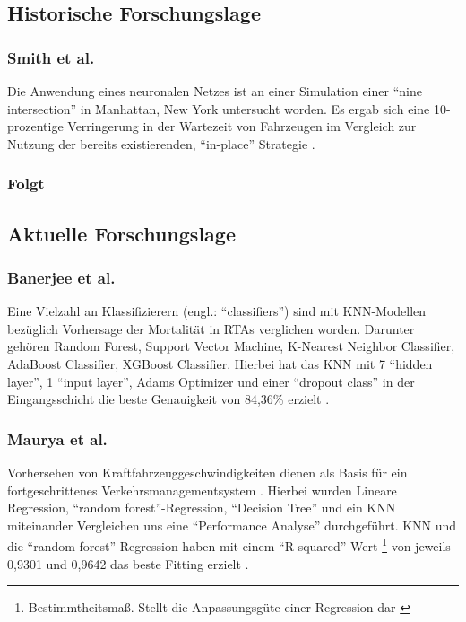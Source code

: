 \documentclass{scrartcl}
\begin{document}
\subsection{Historische Forschungslage}

\subsubsection{Smith et al.}
Die Anwendung eines neuronalen Netzes ist an einer Simulation einer
\enquote{nine intersection} in Manhattan, New York untersucht worden.
Es ergab sich eine 10-prozentige Verringerung in der Wartezeit von Fahrzeugen
im Vergleich zur Nutzung der bereits existierenden, \enquote{in-place} Strategie \cite{smith}.

\subsubsection{Folgt}

\subsection{Aktuelle Forschungslage}

\subsubsection{Banerjee et al.}
Eine Vielzahl an Klassifizierern (engl.: \enquote{classifiers}) sind mit
KNN-Modellen bezüglich Vorhersage der Mortalität in RTAs verglichen worden.
Darunter gehören
Random Forest, Support Vector Machine, K-Nearest Neighbor Classifier,
AdaBoost Classifier, XGBoost Classifier. Hierbei hat das KNN mit 7
\enquote{hidden layer}, 1 \enquote{input layer}, Adams Optimizer und einer
\enquote{dropout class} in der Eingangsschicht die beste Genauigkeit von 84,36\%
erzielt \cite{akt1}.

\subsubsection{Maurya et al.}
Vorhersehen von Kraftfahrzeuggeschwindigkeiten dienen als Basis für ein
fortgeschrittenes Verkehrsmanagementsystem \cite{akt2}. Hierbei wurden
Lineare Regression, \enquote{random forest}-Regression, \enquote{Decision Tree} und
ein KNN miteinander Vergleichen uns eine \enquote{Performance Analyse} durchgeführt.
KNN und die \enquote{random forest}-Regression haben mit einem
\enquote{R squared}-Wert \footnote{Bestimmtheitsmaß.
   Stellt die Anpassungsgüte einer Regression dar \cite{rsquared}}
von jeweils 0,9301 und 0,9642 das beste Fitting erzielt \cite{akt2}.
\end{document}

